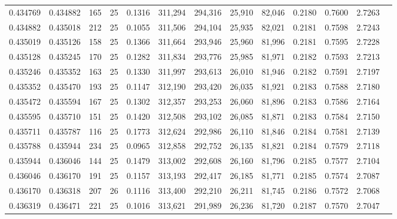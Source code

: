 \begin{tabular}{rrrrrrrrrrrrr}
0.434769 & 0.434882 &   165 &  25 &                                     0.1316 & 311,294 & 294,316 &  25,910 &  82,046 & 0.2180 & 0.7600 & 2.7263 \\
0.434882 & 0.435018 &   212 &  25 &                                     0.1055 & 311,506 & 294,104 &  25,935 &  82,021 & 0.2181 & 0.7598 & 2.7243 \\
0.435019 & 0.435126 &   158 &  25 &                                     0.1366 & 311,664 & 293,946 &  25,960 &  81,996 & 0.2181 & 0.7595 & 2.7228 \\
0.435128 & 0.435245 &   170 &  25 &                                     0.1282 & 311,834 & 293,776 &  25,985 &  81,971 & 0.2182 & 0.7593 & 2.7213 \\
0.435246 & 0.435352 &   163 &  25 &                                     0.1330 & 311,997 & 293,613 &  26,010 &  81,946 & 0.2182 & 0.7591 & 2.7197 \\
0.435352 & 0.435470 &   193 &  25 &                                     0.1147 & 312,190 & 293,420 &  26,035 &  81,921 & 0.2183 & 0.7588 & 2.7180 \\
0.435472 & 0.435594 &   167 &  25 &                                     0.1302 & 312,357 & 293,253 &  26,060 &  81,896 & 0.2183 & 0.7586 & 2.7164 \\
0.435595 & 0.435710 &   151 &  25 &                                     0.1420 & 312,508 & 293,102 &  26,085 &  81,871 & 0.2183 & 0.7584 & 2.7150 \\
0.435711 & 0.435787 &   116 &  25 &                                     0.1773 & 312,624 & 292,986 &  26,110 &  81,846 & 0.2184 & 0.7581 & 2.7139 \\
0.435788 & 0.435944 &   234 &  25 &                                     0.0965 & 312,858 & 292,752 &  26,135 &  81,821 & 0.2184 & 0.7579 & 2.7118 \\
0.435944 & 0.436046 &   144 &  25 &                                     0.1479 & 313,002 & 292,608 &  26,160 &  81,796 & 0.2185 & 0.7577 & 2.7104 \\
0.436046 & 0.436170 &   191 &  25 &                                     0.1157 & 313,193 & 292,417 &  26,185 &  81,771 & 0.2185 & 0.7574 & 2.7087 \\
0.436170 & 0.436318 &   207 &  26 &                                     0.1116 & 313,400 & 292,210 &  26,211 &  81,745 & 0.2186 & 0.7572 & 2.7068 \\
0.436319 & 0.436471 &   221 &  25 &                                     0.1016 & 313,621 & 291,989 &  26,236 &  81,720 & 0.2187 & 0.7570 & 2.7047 \\

\end{tabular}
